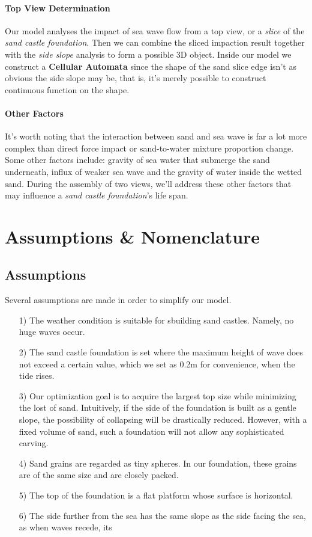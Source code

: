 \documentclass[12pt]{article}
\begin{document}
\paragraph{Top View Determination}
Our model analyses the impact of sea wave flow from a top view, or a \textit{slice} of the \textit{sand castle foundation}. Then we can combine the sliced impaction result together with the \textit{side slope} analysis to form a possible 3D object. Inside our model we construct a \textbf{Cellular Automata} since the shape of the sand slice edge isn't as obvious the side slope may be, that is, it's merely possible to construct continuous function on the shape.

\paragraph{Other Factors}
It's worth noting that the interaction between sand and sea wave is far a lot more complex than direct force impact or sand-to-water mixture proportion change. Some other factors include: gravity of sea water that submerge the sand underneath, influx of weaker sea wave and the gravity of water inside the wetted sand. During the assembly of two views, we'll address these other factors that may influence a \textit{sand castle foundation}'s life span.

\section{Assumptions \& Nomenclature}
\subsection{Assumptions}
Several assumptions are made in order to simplify our model.
\begin{itemize}
    \item [1)]
          The weather condition is suitable for sbuilding sand castles. Namely, no huge waves occur.
    \item [2)]
          The sand castle foundation is set where the maximum height of wave does not exceed a certain value, which we set as 0.2m for convenience, when the tide rises.
    \item [3)]
          Our optimization goal is to acquire the largest top size while minimizing the lost of sand. Intuitively, if the side of the foundation is built as a gentle slope, the possibility of collapsing will be drastically reduced. However, with a fixed volume of sand, such a foundation will not allow any sophisticated carving.
    \item [4)]
          Sand grains are regarded as tiny spheres. In our foundation, these grains are of the same size and are closely packed.
    \item [5)]
          The top of the foundation is a flat platform whose surface is horizontal.
    \item [6)]
          The side further from the sea has the same slope as the side facing the sea, as when waves recede, its
\end{itemize}
\end{document}
